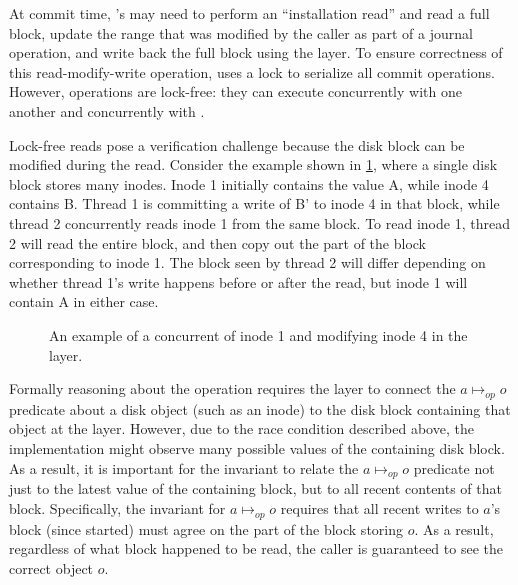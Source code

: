 At commit time, 's  may need to perform an
``installation read'' and read a full block, update the range that was
modified by the caller as part of a journal operation, and write back the
full block using the  layer.  To ensure correctness of this
read-modify-write operation,  uses a lock to serialize
all commit operations.  However,  operations are lock-free:
they can execute concurrently with one another and concurrently with
.

Lock-free reads pose a verification challenge because the disk
block can be modified during the read.  Consider the example shown
in \cref{fig:txn-concur}, where a single disk block stores many
inodes. Inode 1 initially contains the value A, while inode 4 contains B. Thread 1 is committing a write of B' to inode 4 in that block, while
thread 2 concurrently reads inode 1 from the same block.  To read
inode 1, thread 2 will read the entire block, and then copy out the part
of the block corresponding to inode 1.  The block seen by
thread 2 will differ depending on whether thread 1's write happens
before or after the read, but inode 1 will contain A in either case.


\begin{figure}[ht]
\centering

\vspace{-\baselineskip}
\caption{An example of a concurrent  of inode 1 and 
  modifying inode 4
  in the  layer.}
\label{fig:txn-concur}
\end{figure}

Formally reasoning about the  operation requires the 
layer to connect the $a \mapsto_{\mathit{op}} o$ predicate about a disk object
(such as an inode) to the disk block containing that object at the
 layer.  However, due to the race condition described above,
the  implementation might observe many possible values of the
containing disk block.  As a result, it is important for the 
invariant to relate the $a \mapsto_{\mathit{op}} o$ predicate not just to
the latest value of the containing block, but to all recent contents
of that block.  Specifically, the invariant for $a \mapsto_{\mathit{op}} o$
requires that all recent writes to $a$'s block (since 
started) must agree on the part of the block storing $o$.  As a result,
regardless of what block happened to be read,
the caller is guaranteed to see the correct object $o$.


